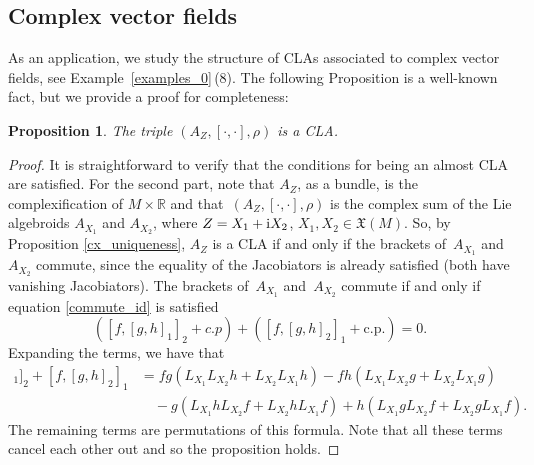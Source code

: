 \documentclass[pdftex]{sigma}
\numberwithin{equation}{section}
\newtheorem{Proposition}[Theorem]{Proposition}
 { \theoremstyle{definition}
\newtheorem{Definition}[Theorem]{Definition}
\newtheorem{Note}[Theorem]{Note}
\newtheorem{Example}[Theorem]{Example}
\newtheorem{Examples}[Theorem]{Examples}
\newtheorem{Remark}[Theorem]{Remark} }
\newcommand{\R}{{\mathbb{R}}}
\newcommand{\X}{\mathfrak{X}}
\begin{document}
\subsection{Complex vector fields}%
As an application, we study the structure of CLAs associated to complex vector fields, see Example~\ref{examples_0}\,(8).
The following Proposition is a well-known fact, but we provide a proof for completeness:
\begin{Proposition}
  The triple $(A_Z, [\cdot,\cdot], \rho)$ is a CLA.
\end{Proposition}
 \begin{proof}
   It is straightforward to verify that the conditions for being an almost CLA are satisfied. For the second part, note that $A_Z$, as a bundle, is the complexification of $M\times \R$ and that~$(A_Z, [\cdot,\cdot], \rho)$ is the complex sum of the Lie algebroids $A_{X_1}$ and $A_{X_2}$,
   where $Z=X_1+{\rm i}X_2$, $X_1,X_2\in \X(M)$. So, by Proposition \ref{cx_uniqueness}, $A_Z$ is a CLA if and only if the brackets of~$A_{X_1}$ and~$A_{X_2}$ commute, since the equality of the Jacobiators is already satisfied (both have vanishing Jacobiators). The brackets of~$A_{X_1}$ and~$A_{X_2}$ commute if and only if equation \eqref{commute_id} is satisfied
   \[([f,[g,h]_1]_2+c.p)+([f,[g,h]_2]_1+\mathrm{c.p.})=0.\]
   Expanding the terms, we have that
   \begin{align*}
   [f,[g,h]_1]_2+[f,[g,h]_2]_1&{}=
fg(L_{X_1}L_{X_2}h+L_{X_2}L_{X_1}h)-fh(L_{X_1}L_{X_2}g+L_{X_2}L_{X_1}g)\\
&\quad{}-g(L_{X_1}h L_{X_2}f+L_{X_2}h L_{X_1}f)+h(L_{X_1}g L_{X_2}f+L_{X_2}g L_{X_1}f).
     \end{align*}
 The remaining terms are permutations of this formula. Note that all these terms cancel each other out and so the proposition holds.
\end{proof}
\end{document}
